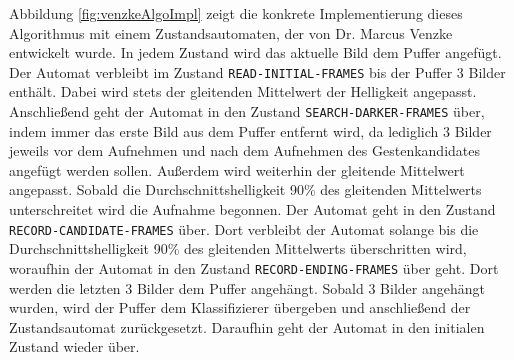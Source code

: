\newline
\newline
Abbildung \ref{fig:venzkeAlgoImpl} zeigt die konkrete Implementierung dieses Algorithmus mit einem Zustandsautomaten, der von Dr. Marcus Venzke entwickelt wurde. In jedem Zustand wird das aktuelle Bild dem Puffer angefügt.
Der Automat verbleibt im Zustand \texttt{READ-INITIAL-FRAMES} bis der Puffer 3 Bilder enthält. Dabei wird stets der gleitenden Mittelwert der Helligkeit angepasst. Anschließend geht der Automat in den Zustand
\texttt{SEARCH-DARKER-FRAMES} über, indem immer das erste Bild aus dem Puffer entfernt wird, da lediglich 3 Bilder jeweils vor dem Aufnehmen und nach dem Aufnehmen des
Gestenkandidates angefügt werden sollen. Außerdem wird weiterhin der gleitende Mittelwert angepasst. Sobald die Durchschnittshelligkeit 90\% des gleitenden Mittelwerts unterschreitet wird die Aufnahme begonnen.
Der Automat geht in den Zustand \texttt{RECORD-CANDIDATE-FRAMES} über. Dort verbleibt der Automat solange bis die Durchschnittshelligkeit 90\% des gleitenden Mittelwerts überschritten wird, woraufhin der Automat
in den Zustand \texttt{RECORD-ENDING-FRAMES} über geht. Dort werden die letzten 3 Bilder dem Puffer angehängt. Sobald 3 Bilder angehängt wurden, wird der Puffer dem Klassifizierer übergeben und anschließend
der Zustandsautomat zurückgesetzt. Daraufhin geht der Automat in den initialen Zustand wieder über.
